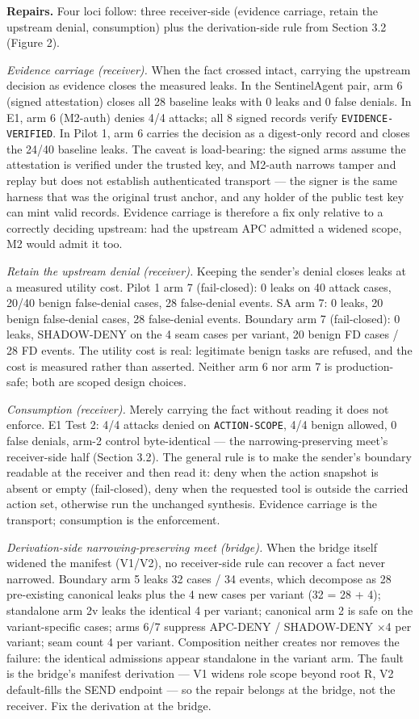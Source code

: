\documentclass[
  10pt,
]{article}
\renewcommand{\_}{\origunderscore\allowbreak}
\begin{document}
\textbf{Repairs.} Four loci follow: three receiver-side (evidence
carriage, retain the upstream denial, consumption) plus the
derivation-side rule from Section 3.2 (Figure 2).

\emph{Evidence carriage (receiver).} When the fact crossed intact,
carrying the upstream decision as evidence closes the measured leaks. In
the SentinelAgent pair, arm 6 (signed attestation) closes all 28
baseline leaks with 0 leaks and 0 false denials. In E1, arm 6 (M2-auth)
denies 4/4 attacks; all 8 signed records verify
\texttt{EVIDENCE-VERIFIED}. In Pilot 1, arm 6 carries the decision as a
digest-only record and closes the 24/40 baseline leaks. The caveat is
load-bearing: the signed arms assume the attestation is verified under
the trusted key, and M2-auth narrows tamper and replay but does not
establish authenticated transport --- the signer is the same harness
that was the original trust anchor, and any holder of the public test
key can mint valid records. Evidence carriage is therefore a fix only
relative to a correctly deciding upstream: had the upstream APC admitted
a widened scope, M2 would admit it too.

\emph{Retain the upstream denial (receiver).} Keeping the sender's
denial closes leaks at a measured utility cost. Pilot 1 arm 7
(fail-closed): 0 leaks on 40 attack cases, 20/40 benign false-denial
cases, 28 false-denial events. SA arm 7: 0 leaks, 20 benign false-denial
cases, 28 false-denial events. Boundary arm 7 (fail-closed): 0 leaks,
SHADOW-DENY on the 4 seam cases per variant, 20 benign FD cases / 28 FD
events. The utility cost is real: legitimate benign tasks are refused,
and the cost is measured rather than asserted. Neither arm 6 nor arm 7
is production-safe; both are scoped design choices.

\emph{Consumption (receiver).} Merely carrying the fact without reading
it does not enforce. E1 Test 2: 4/4 attacks denied on
\texttt{ACTION-SCOPE}, 4/4 benign allowed, 0 false denials, arm-2
control byte-identical --- the narrowing-preserving meet's receiver-side
half (Section 3.2). The general rule is to make the sender's boundary
readable at the receiver and then read it: deny when the action snapshot
is absent or empty (fail-closed), deny when the requested tool is
outside the carried action set, otherwise run the unchanged synthesis.
Evidence carriage is the transport; consumption is the enforcement.

\emph{Derivation-side narrowing-preserving meet (bridge).} When the
bridge itself widened the manifest (V1/V2), no receiver-side rule can
recover a fact never narrowed. Boundary arm 5 leaks 32 cases / 34
events, which decompose as 28 pre-existing canonical leaks plus the 4
new cases per variant (32 = 28 + 4); standalone arm 2v leaks the
identical 4 per variant; canonical arm 2 is safe on the variant-specific
cases; arms 6/7 suppress APC-DENY / SHADOW-DENY ×4 per variant; seam
count 4 per variant. Composition neither creates nor removes the
failure: the identical admissions appear standalone in the variant arm.
The fault is the bridge's manifest derivation --- V1 widens role scope
beyond root R, V2 default-fills the SEND endpoint --- so the repair
belongs at the bridge, not the receiver. Fix the derivation at the
bridge.
\end{document}
